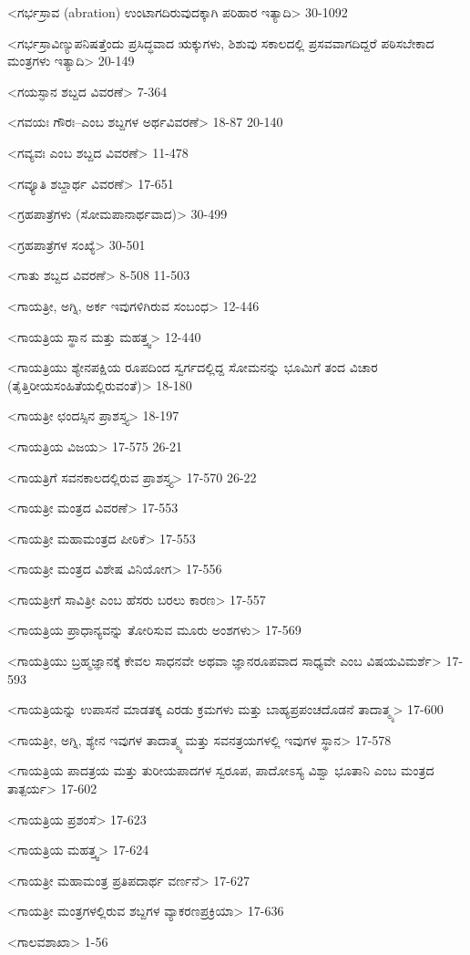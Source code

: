 <ಗರ್ಭಸ್ರಾವ (abration) ಉಂಟಾಗದಿರುವುದಕ್ಕಾಗಿ ಪರಿಹಾರ ಇತ್ಯಾದಿ>
30-1092

<ಗರ್ಭಸ್ರಾವಿಣ್ಯುಪನಿಷತ್ತೆಂದು ಪ್ರಸಿದ್ಧವಾದ ಋಕ್ಕುಗಳು, ಶಿಶುವು ಸಕಾಲದಲ್ಲಿ ಪ್ರಸವವಾಗದಿದ್ದರೆ ಪಠಿಸಬೇಕಾದ ಮಂತ್ರಗಳು ಇತ್ಯಾದಿ>
20-149

<ಗಯಸ್ಫಾನ ಶಬ್ದದ ವಿವರಣೆ>
7-364

<ಗವಯಃ ಗೌರಃ–ಎಂಬ ಶಬ್ದಗಳ ಅರ್ಥವಿವರಣೆ>
18-87 
20-140

<ಗವ್ಯವಃ ಎಂಬ ಶಬ್ದದ ವಿವರಣೆ>
11-478

<ಗವ್ಯೂತಿ ಶಬ್ದಾರ್ಥ ವಿವರಣೆ>
17-651

<ಗ್ರಹಪಾತ್ರೆಗಳು (ಸೋಮಪಾನಾರ್ಥವಾದ)>
30-499

<ಗ್ರಹಪಾತ್ರೆಗಳ ಸಂಖ್ಯೆ>
30-501

<ಗಾತು ಶಬ್ದದ ವಿವರಣೆ>
8-508 
11-503

<ಗಾಯತ್ರೀ, ಅಗ್ನಿ, ಅರ್ಕ ಇವುಗಳಿಗಿರುವ ಸಂಬಂಧ>
12-446

<ಗಾಯತ್ರಿಯ ಸ್ಥಾನ ಮತ್ತು ಮಹತ್ತ್ವ>
12-440

<ಗಾಯತ್ರಿಯು ಶ್ಯೇನಪಕ್ಷಿಯ ರೂಪದಿಂದ ಸ್ವರ್ಗದಲ್ಲಿದ್ದ ಸೋಮನನ್ನು ಭೂಮಿಗೆ ತಂದ ವಿಚಾರ (ತೈತ್ತಿರೀಯಸಂಹಿತೆಯಲ್ಲಿರುವಂತೆ)>
18-180

<ಗಾಯತ್ರೀ ಛಂದಸ್ಸಿನ ಪ್ರಾಶಸ್ತ್ಯ>
18-197

<ಗಾಯತ್ರಿಯ ವಿಜಯ>
17-575 
26-21

<ಗಾಯತ್ರಿಗೆ ಸವನಕಾಲದಲ್ಲಿರುವ ಪ್ರಾಶಸ್ತ್ಯ>
17-570 
26-22

<ಗಾಯತ್ರೀ ಮಂತ್ರದ ವಿವರಣೆ>
17-553

<ಗಾಯತ್ರೀ ಮಹಾಮಂತ್ರದ ಪೀಠಿಕೆ>
17-553

<ಗಾಯತ್ರೀ ಮಂತ್ರದ ವಿಶೇಷ ವಿನಿಯೋಗ>
17-556

<ಗಾಯತ್ರೀಗೆ ಸಾವಿತ್ರೀ ಎಂಬ ಹೆಸರು ಬರಲು ಕಾರಣ>
17-557

<ಗಾಯತ್ರಿಯ ಪ್ರಾಧಾನ್ಯವನ್ನು ತೋರಿಸುವ ಮೂರು ಅಂಶಗಳು>
17-569

<ಗಾಯತ್ರಿಯು ಬ್ರಹ್ಮಜ್ಞಾನಕ್ಕೆ ಕೇವಲ ಸಾಧನವೇ ಅಥವಾ ಜ್ಞಾನರೂಪವಾದ ಸಾಧ್ಯವೇ ಎಂಬ ವಿಷಯವಿಮರ್ಶೆ>
17-593

<ಗಾಯತ್ರಿಯನ್ನು ಉಪಾಸನೆ ಮಾಡತಕ್ಕ ಎರಡು ಕ್ರಮಗಳು ಮತ್ತು ಬಾಹ್ಯಪ್ರಪಂಚದೊಡನೆ ತಾದಾತ್ಮ್ಯ>
17-600

<ಗಾಯತ್ರೀ, ಅಗ್ನಿ, ಶ್ಯೇನ ಇವುಗಳ ತಾದಾತ್ಮ್ಯ ಮತ್ತು ಸವನತ್ರಯಗಳಲ್ಲಿ ಇವುಗಳ ಸ್ಥಾನ>
17-578

<ಗಾಯತ್ರಿಯ ಪಾದತ್ರಯ ಮತ್ತು ತುರೀಯಪಾದಗಳ ಸ್ವರೂಪ, ಪಾದೋಽಸ್ಯ ವಿಶ್ವಾ ಭೂತಾನಿ ಎಂಬ ಮಂತ್ರದ ತಾತ್ಪರ್ಯ>
17-602

<ಗಾಯತ್ರಿಯ ಪ್ರಶಂಸೆ>
17-623

<ಗಾಯತ್ರಿಯ ಮಹತ್ತ್ವ>
17-624

<ಗಾಯತ್ರೀ ಮಹಾಮಂತ್ರ ಪ್ರತಿಪದಾರ್ಥ ವರ್ಣನೆ>
17-627

<ಗಾಯತ್ರೀ ಮಂತ್ರಗಳಲ್ಲಿರುವ ಶಬ್ದಗಳ ವ್ಯಾಕರಣಪ್ರಕ್ರಿಯಾ>
17-636

<ಗಾಲವಶಾಖಾ>
1-56

